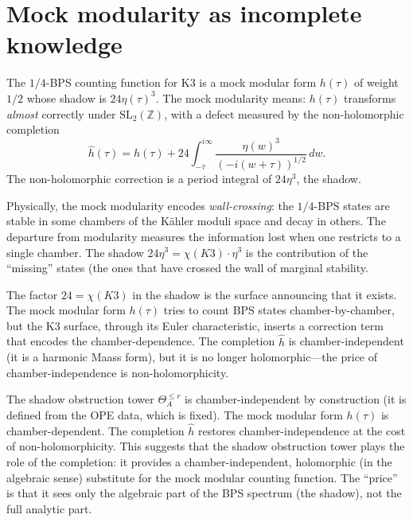 \documentclass[11pt]{article}
\newcommand{\Z}{\mathbb{Z}}
\begin{document}
\section{Mock modularity as incomplete knowledge}
\label{sec:motivic-mock-modularity}

The $1/4$-BPS counting function for K3 is a mock modular form $h(\tau)$ of weight $1/2$ whose shadow is $24 \eta(\tau)^3$. The mock modularity means: $h(\tau)$ transforms \emph{almost} correctly under $\mathrm{SL}_2(\Z)$, with a defect measured by the non-holomorphic completion
\[
 \widehat{h}(\tau) = h(\tau) + 24 \int_{-\bar{\tau}}^{i\infty} \frac{\eta(w)^3}{(-i(w + \tau))^{1/2}}\, dw.
\]
The non-holomorphic correction is a period integral of $24 \eta^3$, the shadow.

Physically, the mock modularity encodes \emph{wall-crossing}: the $1/4$-BPS states are stable in some chambers of the K\"ahler moduli space and decay in others. The departure from modularity measures the information lost when one restricts to a single chamber. The shadow $24\eta^3 = \chi(K3) \cdot \eta^3$ is the contribution of the ``missing'' states (the ones that have crossed the wall of marginal stability.

The factor $24 = \chi(K3)$ in the shadow is the surface announcing that it exists. The mock modular form $h(\tau)$ tries to count BPS states chamber-by-chamber, but the K3 surface, through its Euler characteristic, inserts a correction term that encodes the chamber-dependence. The completion $\widehat{h}$ is chamber-independent (it is a harmonic Maass form), but it is no longer holomorphic---the price of chamber-independence is non-holomorphicity.

\begin{observation}
The shadow obstruction tower $\Theta_A^{\leq r}$ is chamber-independent by construction (it is defined from the OPE data, which is fixed). The mock modular form $h(\tau)$ is chamber-dependent. The completion $\widehat{h}$ restores chamber-independence at the cost of non-holomorphicity. This suggests that the shadow obstruction tower plays the role of the completion: it provides a chamber-independent, holomorphic (in the algebraic sense) substitute for the mock modular counting function. The ``price'' is that it sees only the algebraic part of the BPS spectrum (the shadow), not the full analytic part.
\end{observation}
\end{document}
